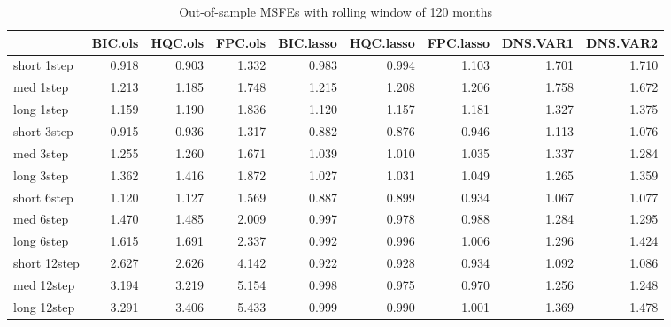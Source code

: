 \begin{table}[htbp]
\centering
\begin{table}

\caption{\label{tab:tbl:table4-120}Out-of-sample MSFEs with rolling window of 120 months}
\centering
\begin{tabular}[t]{lrrrrrrrr}
\toprule
  & BIC.ols & HQC.ols & FPC.ols & BIC.lasso & HQC.lasso & FPC.lasso & DNS.VAR1 & DNS.VAR2\\
\midrule
short 1step & 0.918 & 0.903 & 1.332 & 0.983 & 0.994 & 1.103 & 1.701 & 1.710\\
med 1step & 1.213 & 1.185 & 1.748 & 1.215 & 1.208 & 1.206 & 1.758 & 1.672\\
long 1step & 1.159 & 1.190 & 1.836 & 1.120 & 1.157 & 1.181 & 1.327 & 1.375\\
short 3step & 0.915 & 0.936 & 1.317 & 0.882 & 0.876 & 0.946 & 1.113 & 1.076\\
med 3step & 1.255 & 1.260 & 1.671 & 1.039 & 1.010 & 1.035 & 1.337 & 1.284\\
\addlinespace
long 3step & 1.362 & 1.416 & 1.872 & 1.027 & 1.031 & 1.049 & 1.265 & 1.359\\
short 6step & 1.120 & 1.127 & 1.569 & 0.887 & 0.899 & 0.934 & 1.067 & 1.077\\
med 6step & 1.470 & 1.485 & 2.009 & 0.997 & 0.978 & 0.988 & 1.284 & 1.295\\
long 6step & 1.615 & 1.691 & 2.337 & 0.992 & 0.996 & 1.006 & 1.296 & 1.424\\
short 12step & 2.627 & 2.626 & 4.142 & 0.922 & 0.928 & 0.934 & 1.092 & 1.086\\
\addlinespace
med 12step & 3.194 & 3.219 & 5.154 & 0.998 & 0.975 & 0.970 & 1.256 & 1.248\\
long 12step & 3.291 & 3.406 & 5.433 & 0.999 & 0.990 & 1.001 & 1.369 & 1.478\\
\bottomrule
\end{tabular}
\end{table}
\label{tbl:table4-120}
\end{table}
